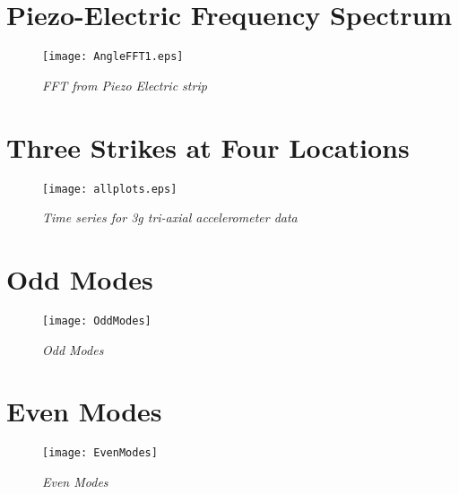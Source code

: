 \documentclass[12pt,doublespace]{report}
\begin{document}
\appendix
\chapter{Piezo-Electric Frequency Spectrum}
\begin{figure}[h]
\centering
\texttt{[image: AngleFFT1.eps]}
\caption{\textit{FFT from Piezo Electric strip}}
\label{app:AngleFFT1}
\end{figure}


\chapter{Three Strikes at Four Locations}
\begin{figure}[h]
\centering
\texttt{[image: allplots.eps]}
\caption{\textit{Time series for 3g tri-axial accelerometer data}}
\label{app:RES_3g_T_ALL}
\end{figure}

\chapter{Odd Modes}
\begin{figure}[h]
\centering
\texttt{[image: OddModes]}
\caption{\textit{Odd Modes}}
\label{app:Odd Modes}
\end{figure}

\chapter{Even Modes}
\begin{figure}[h]
\centering
\texttt{[image: EvenModes]}
\caption{\textit{Even Modes}}
\label{app:Even Modes}
\end{figure}





\end{document}
